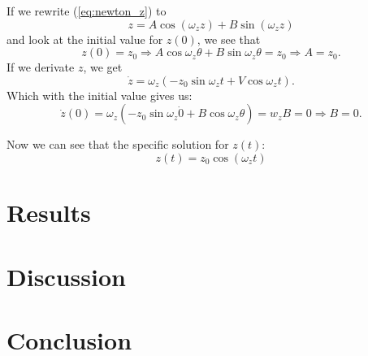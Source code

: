 \documentclass[english,notitlepage,reprint,nofootinbib]{revtex4-1}  %
\begin{document}
	If we rewrite (\ref{eq:newton_z}) to 
	\begin{equation*}
		z = A \cos (\omega_z z) + B \sin (\omega_z z)
	\end{equation*}
	and look at the initial value for $z(0)$, we see that
	\begin{equation*}
		z(0) = z_0 \Rightarrow A \cos \omega_z \theta + B \sin \omega_z \theta = z_0 \Rightarrow A = z_0.
	\end{equation*}
	If we derivate $z$, we get 
	\begin{equation*}
		\dot{z} = \omega_z (-z_0 \sin \omega_z t + V \cos \omega_z t).
	\end{equation*}
	Which with the initial value gives us:
	\begin{equation*}
		\dot{z}(0) = \omega_z (- z_0 \sin \omega_z \dot 0 + B \cos \omega_z \theta) = w_z B = 0 \Rightarrow B = 0.
	\end{equation*}

	Now we can see that the specific solution for $z(t)$:
	\begin{equation*}
		z(t) = z_0 \cos (\omega_z t)
	\end{equation*}







	
	
	\section{Results}\label{sec:results}
	
	
	\section{Discussion}\label{sec:discussion}
	
	
	\section{Conclusion}\label{sec:conclusion}
	
	\onecolumngrid
	
	
	
	
\end{document}

